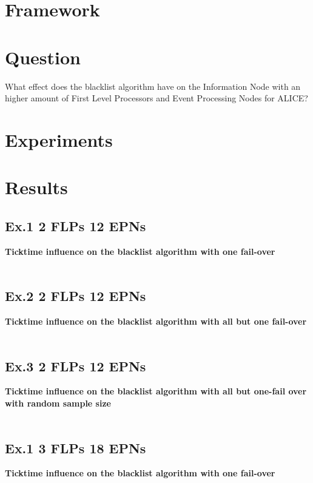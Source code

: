 \documentclass{report}
\begin{document}


\newpage

\chapter{Framework}



\chapter{Question}
What effect does the blacklist algorithm have on the Information Node with an higher amount of First Level Processors and Event Processing Nodes for ALICE?

\chapter{Experiments}



\chapter{Results}

\section{Ex.1 2 FLPs 12 EPNs}
\textbf{Ticktime influence on the blacklist algorithm with one fail-over}
\\\\

\section{Ex.2 2 FLPs 12 EPNs}
\textbf{Ticktime influence on the blacklist algorithm with all but one fail-over}
\\\\

\section{Ex.3 2 FLPs 12 EPNs}
\textbf{Ticktime influence on the blacklist algorithm with all but one-fail over with random sample size}
\\\\

\section{Ex.1 3 FLPs 18 EPNs}
\textbf{Ticktime influence on the blacklist algorithm with one fail-over}
\\\\
\end{document}

